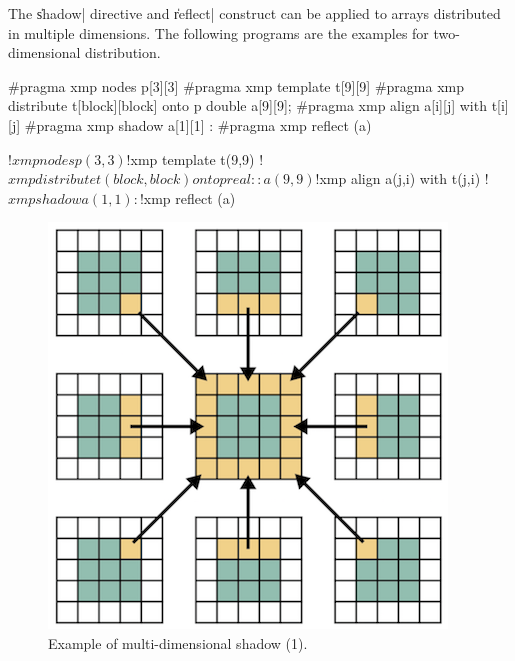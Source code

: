 

The \|shadow| directive and \|reflect| construct can be applied to
arrays distributed in multiple dimensions. The following programs are the
examples for two-dimensional distribution.

\begin{XCexample}
#pragma xmp nodes p[3][3]
#pragma xmp template t[9][9]
#pragma xmp distribute t[block][block] onto p
double a[9][9];
#pragma xmp align a[i][j] with t[i][j]
#pragma xmp shadow a[1][1]
   :
#pragma xmp reflect (a)
\end{XCexample}

\begin{XFexample}
!$xmp nodes p(3,3)
!$xmp template t(9,9)
!$xmp distribute t(block,block) onto p
real :: a(9,9)
!$xmp align a(j,i) with t(j,i)
!$xmp shadow a(1,1)
   :
!$xmp reflect (a)
\end{XFexample}

\begin{figure}
  \centering
  \includegraphics{figs/multi1.png}
  \caption{Example of multi-dimensional shadow (1).}
\end{figure}

